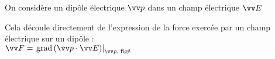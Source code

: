 \documentclass[a4paper]{article}
\begin{document}
\pagestyle{fancy}
\fancyhf{}
\setlength{\headheight}{15pt}

\begin{center}
	\large{}
\end{center}


On considère un dipôle électrique $\vv p$ dans un champ électrique $\vv E$\\
\par

Cela découle directement de l'expression de la force exercée par un champ électrique sur un dipôle : \\
\( \vv F = \left.\mathrm{grad}\,(\vv p \cdot \vv E)\right|_{\vv p,\;\text{figé}} \)
\end{document}
